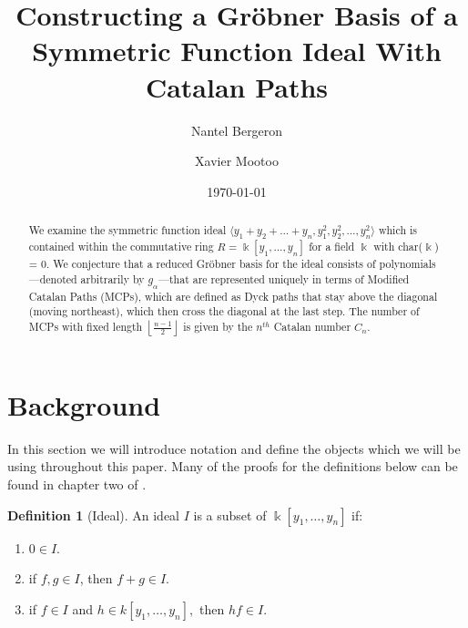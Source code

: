 \documentclass[12pt,reqno]{amsart}
\date{\today}
\author{Nantel Bergeron}\address[Bergeron]
\author{Xavier Mootoo}\address[Mootoo]
\title[{G}r\"obner Basis for a Symmetric Function Ideal]{{C}onstructing a Gr\"obner Basis of a Symmetric Function Ideal With Catalan Paths}
\theoremstyle{plain}
\theoremstyle{definition}
\newtheorem{definition}[theorem]{Definition}
\def\field{\Bbbk}
\begin{document}
\begin{abstract}
	We examine the symmetric function ideal $\langle y_1 + y_2 + \dots + y_n, y^2_1, y^2_2, \dots , y^2_n \rangle$ which is contained within the commutative ring $R = \field[y_1, \dots , y_n]$ for a field
	$\field$ with char($\field$) = 0. We conjecture that a reduced Gr\"obner basis for the
	ideal consists of polynomials—denoted arbitrarily by $g_\alpha$—that are
	represented uniquely in terms of Modified Catalan Paths (MCPs), which
	are defined as Dyck paths that stay above the diagonal (moving northeast),
	which then cross the diagonal at the last step. The number of MCPs with
	fixed length $ \left\lfloor \frac{n-1}{2} \right\rfloor$ is given by the $n^{th}$ Catalan number $C_n$.
\end{abstract}

\maketitle

\section{Background} 
In this section we will introduce notation and define the objects which we will be using throughout this paper. Many of the proofs for the definitions 
below can be found in chapter two of \cite{iva}.

\begin{comment} %
    \begin{definition}[Symmetric Function]
	Consider the ring $R = \field[y_1, \dots , y_n]$ of polynomials with $n$ variables with rational integer 
	coefficients. Then any function $f = (y_1, y_2, \dots, y_n) \in R$ that is invariant upon applying a
	permutation $\sigma$ in the symmetric group $S_n$, such that $f = (y_1, y_2, \dots, y_n) = 
	f(y_{\sigma(1)}, y_{\sigma(2)}, \dots, y_{\sigma(n)})$, then $f$ is a symmetric function.
\end{definition}
\end{comment}


\begin{definition}[Ideal]
	An ideal $I$ is a subset of $\field[y_1, \dots, y_n]$ if:
	\begin{enumerate}
		\item $0 \in I$.
		\item if $f, g \in I$, then $f + g \in I$.
		\item if $f \in I$ and $ h \in k[y_1, \dots, y_n],$ then $hf \in I$.
	\end{enumerate}
\end{definition}
\end{document}
